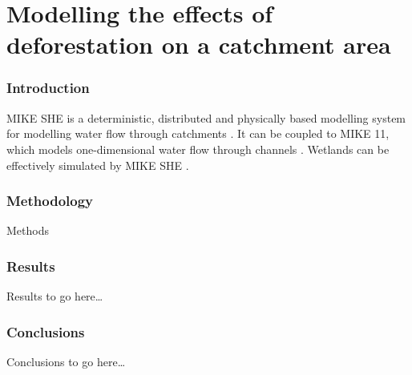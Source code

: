 \documentclass{article}
\begin{document}

\part*{Modelling the effects of deforestation on a catchment area}

\section{Introduction}
MIKE SHE is a deterministic, distributed and physically based modelling system for modelling water flow through catchments \parencite{refshaard1995mike}. It can be coupled to MIKE 11, which models one-dimensional water flow through channels \parencite{havno1995mike}. Wetlands can be effectively simulated by MIKE SHE \parencite{thompson2004simulation}. 

\section{Methodology}
Methods

\section{Results}
Results to go here\ldots

\section{Conclusions}
Conclusions to go here\ldots

\printbibliography[filter=practical2]
\end{document}
